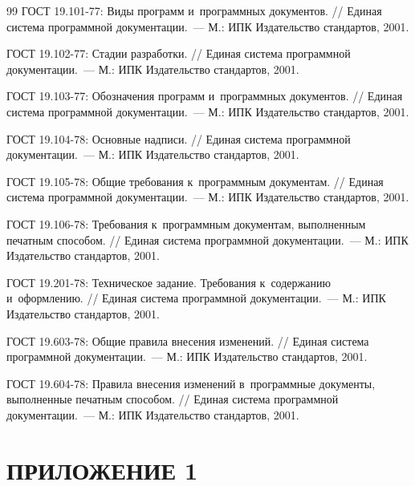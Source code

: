 \documentclass[12pt,a4paper]{extarticle}
\begin{document}
\renewcommand{\refname}{}
\begin{thebibliography}{99}
ГОСТ 19.101-77: Виды программ и~программных документов. // Единая система программной документации.~--- М.: ИПК Издательство стандартов, 2001.

ГОСТ 19.102-77: Стадии разработки. // Единая система программной документации.~--- М.: ИПК Издательство стандартов, 2001.

ГОСТ 19.103-77: Обозначения программ и~программных документов. // Единая система программной документации.~--- М.: ИПК Издательство стандартов, 2001.

ГОСТ 19.104-78: Основные надписи. // Единая система программной документации.~--- М.: ИПК Издательство стандартов, 2001.

ГОСТ 19.105-78: Общие требования к~программным документам. // Единая система программной документации.~--- М.: ИПК Издательство стандартов, 2001.

ГОСТ 19.106-78: Требования к~программным документам, выполненным печатным способом. // Единая система программной документации.~--- М.: ИПК Издательство стандартов, 2001.

ГОСТ 19.201-78: Техническое задание. Требования к~содержанию и~оформлению. // Единая система программной документации.~--- М.: ИПК Издательство стандартов, 2001.

ГОСТ 19.603-78: Общие правила внесения изменений. // Единая система программной документации.~--- М.: ИПК Издательство стандартов, 2001.

ГОСТ 19.604-78: Правила внесения изменений в~программные документы, выполненные печатным способом. // Единая система программной документации.~--- М.: ИПК Издательство стандартов, 2001.
\end{thebibliography}

\clearpage

\section*{ПРИЛОЖЕНИЕ 1}
\end{document}
